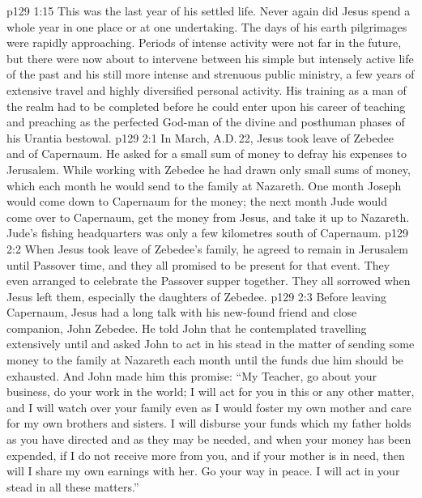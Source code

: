 \vs p129 1:15 This was the last year of his settled life. Never again did Jesus spend a whole year in one place or at one undertaking. The days of his earth pilgrimages were rapidly approaching. Periods of intense activity were not far in the future, but there were now about to intervene between his simple but intensely active life of the past and his still more intense and strenuous public ministry, a few years of extensive travel and highly diversified personal activity. His training as a man of the realm had to be completed before he could enter upon his career of teaching and preaching as the perfected God\hyp{}man of the divine and posthuman phases of his Urantia bestowal.
\vs p129 2:1 In March, A.D.\,22, Jesus took leave of Zebedee and of Capernaum. He asked for a small sum of money to defray his expenses to Jerusalem. While working with Zebedee he had drawn only small sums of money, which each month he would send to the family at Nazareth. One month Joseph would come down to Capernaum for the money; the next month Jude would come over to Capernaum, get the money from Jesus, and take it up to Nazareth. Jude’s fishing headquarters was only a few kilometres south of Capernaum.
\vs p129 2:2 When Jesus took leave of Zebedee’s family, he agreed to remain in Jerusalem until Passover time, and they all promised to be present for that event. They even arranged to celebrate the Passover supper together. They all sorrowed when Jesus left them, especially the daughters of Zebedee.
\vs p129 2:3 \pc Before leaving Capernaum, Jesus had a long talk with his new\hyp{}found friend and close companion, John Zebedee. He told John that he contemplated travelling extensively until  and asked John to act in his stead in the matter of sending some money to the family at Nazareth each month until the funds due him should be exhausted. And John made him this promise: “My Teacher, go about your business, do your work in the world; I will act for you in this or any other matter, and I will watch over your family even as I would foster my own mother and care for my own brothers and sisters. I will disburse your funds which my father holds as you have directed and as they may be needed, and when your money has been expended, if I do not receive more from you, and if your mother is in need, then will I share my own earnings with her. Go your way in peace. I will act in your stead in all these matters.”
